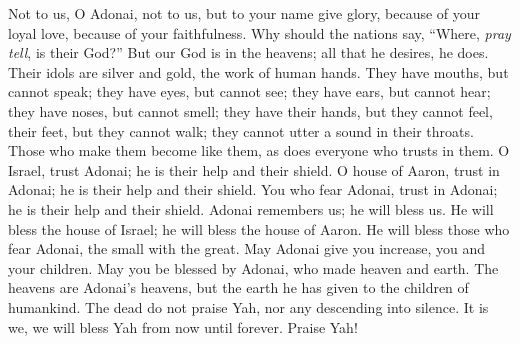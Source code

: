 \begin{biblechapter} %
 Not to us, O Adonai, not to us, 
but to your name give glory, 
because of your loyal love, 
because of your faithfulness.
\verse Why should the nations say, 
“Where, \textit{pray tell}, is their God?”
\verse But our God is in the heavens; 
all that he desires, he does.
\verse Their idols are silver and gold, 
the work of human hands.
\verse They have mouths, but cannot speak; 
they have eyes, but cannot see;
\verse they have ears, but cannot hear; 
they have noses, but cannot smell;
\verse they have their hands, but they cannot feel, 
their feet, but they cannot walk; 
they cannot utter a sound in their throats.
\verse Those who make them become like them, 
as does everyone who trusts in them.
\verse O Israel, trust Adonai; 
he is their help and their shield.
\verse O house of Aaron, trust in Adonai; 
he is their help and their shield.
\verse You who fear Adonai, trust in Adonai; 
he is their help and their shield.
\verse Adonai remembers us; he will bless us. 
He will bless the house of Israel; 
he will bless the house of Aaron.
\verse He will bless those who fear Adonai, 
the small with the great.
\verse May Adonai give you increase, 
you and your children.
\verse May you be blessed by Adonai, 
who made heaven and earth.
\verse The heavens are Adonai’s heavens, 
but the earth he has given to the children of humankind.
\verse The dead do not praise Yah, 
nor any descending into silence.
\verse It is we, we will bless Yah 
from now until forever. 
Praise Yah!
\end{biblechapter}

